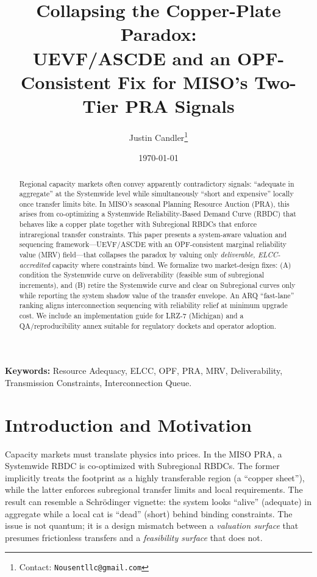 \documentclass[11pt]{article}
\title{Collapsing the Copper-Plate Paradox:\\
UEVF/ASCDE and an OPF-Consistent Fix for MISO's Two-Tier PRA Signals}
\author{Justin Candler\thanks{Contact: \texttt{Nousentllc@gmail.com}}}
\date{\today}
\numberwithin{equation}{section}
\theoremstyle{definition}
\theoremstyle{remark}
\begin{document}
\maketitle

\begin{abstract}
Regional capacity markets often convey apparently contradictory signals: ``adequate in aggregate'' at the Systemwide level while simultaneously ``short and expensive'' locally once transfer limits bite. In MISO's seasonal Planning Resource Auction (PRA), this arises from co-optimizing a Systemwide Reliability-Based Demand Curve (RBDC) that behaves like a copper plate together with Subregional RBDCs that enforce intraregional transfer constraints. This paper presents a system-aware valuation and sequencing framework---UEVF/ASCDE with an OPF-consistent marginal reliability value (MRV) field---that collapses the paradox by valuing only \emph{deliverable, ELCC-accredited} capacity where constraints bind. We formalize two market-design fixes: (A) condition the Systemwide curve on deliverability (feasible sum of subregional increments), and (B) retire the Systemwide curve and clear on Subregional curves only while reporting the system shadow value of the transfer envelope. An ARQ ``fast-lane'' ranking aligns interconnection sequencing with reliability relief at minimum upgrade cost. We include an implementation guide for LRZ-7 (Michigan) and a QA/reproducibility annex suitable for regulatory dockets and operator adoption.
\end{abstract}

\noindent\textbf{Keywords:} Resource Adequacy, ELCC, OPF, PRA, MRV, Deliverability, Transmission Constraints, Interconnection Queue.

\newpage

\section{Introduction and Motivation}
Capacity markets must translate physics into prices. In the MISO PRA, a Systemwide RBDC is co-optimized with Subregional RBDCs. The former implicitly treats the footprint as a highly transferable region (a ``copper sheet''), while the latter enforces subregional transfer limits and local requirements. The result can resemble a Schrödinger vignette: the system looks ``alive'' (adequate) in aggregate while a local cat is ``dead'' (short) behind binding constraints. The issue is not quantum; it is a design mismatch between a \emph{valuation surface} that presumes frictionless transfers and a \emph{feasibility surface} that does not.
\end{document}
